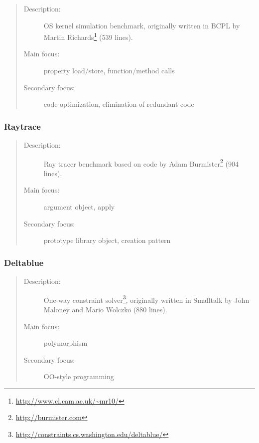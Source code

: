 \documentclass[onecolumn, openright, master, english, signatures]{dbrgrptt}
\begin{document}
\begin{quote}
\begin{description}
\item[Description:] OS kernel simulation benchmark, originally written in BCPL by Martin Richards\footnote{\url{http://www.cl.cam.ac.uk/~mr10/}} (539 lines).
\item[Main focus:] property load/store, function/method calls
\item[Secondary focus:] code optimization, elimination of redundant code
\end{description}
\end{quote}

\subsubsection{Raytrace}

\begin{quote}
\begin{description}
\item[Description:] Ray tracer benchmark based on code by Adam Burmister\footnote{\url{http://burmister.com}} (904 lines).
\item[Main focus:] argument object, apply
\item[Secondary focus:] prototype library object, creation pattern
\end{description}
\end{quote}

\subsubsection{Deltablue}

\begin{quote}
\begin{description}
\item[Description:] One-way constraint solver\footnote{\url{http://constraints.cs.washington.edu/deltablue/}}, originally written in Smalltalk by John Maloney and Mario Wolczko (880 lines).
\item[Main focus:] polymorphism
\item[Secondary focus:] OO-style programming
\end{description}
\end{quote}


\end{document}
